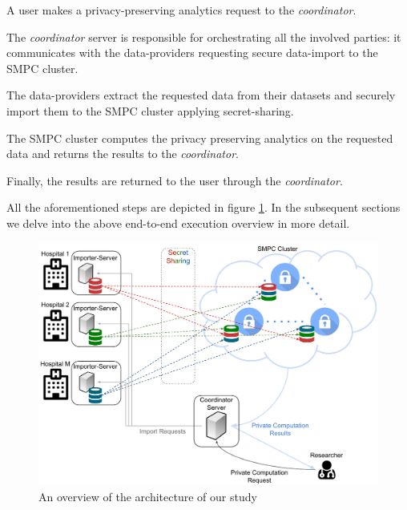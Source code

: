 \begin{description}[labelwidth=4em, leftmargin=\dimexpr\labelwidth+\labelsep\relax]
    \item [Step 1:] A user makes a privacy\hyp preserving analytics request to the \textit{coordinator}.
    \item [Step 2:] The \textit{coordinator} server is responsible for orchestrating all the involved parties: it communicates with the data\hyp providers requesting secure data\hyp import to the SMPC cluster.
    \item [Step 3:] The data\hyp providers extract the requested data from their datasets and securely import them to the SMPC cluster applying secret\hyp sharing.
    \item [Step 4:] The SMPC cluster computes the privacy preserving analytics on the requested data and returns the results to the \textit{coordinator}.
    \item [Step 5:] Finally, the results are returned to the user through the \textit{coordinator}.
\end{description}

All the aforementioned steps are depicted in figure \ref{f:overview}.
In the subsequent sections we delve into the above end\hyp to\hyp end execution overview in more detail.

\begin{figure}[H]
  \centering
  \includegraphics[width=\linewidth]{figures/overview.pdf}
  \caption{An overview of the architecture of our study}\label{f:overview}
\end{figure}



